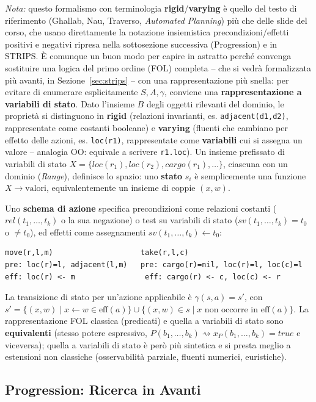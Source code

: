 \documentclass[a4paper,11pt]{article}
\begin{document}
\emph{Nota:} questo formalismo con terminologia \textbf{rigid}/\textbf{varying} è quello del testo di riferimento (Ghallab, Nau, Traverso, \emph{Automated Planning}) più che delle slide del corso, che usano direttamente la notazione insiemistica precondizioni/effetti positivi e negativi ripresa nella sottosezione successiva (Progression) e in STRIPS. È comunque un buon modo per capire in astratto perché convenga sostituire una logica del primo ordine (FOL) completa -- che si vedrà formalizzata più avanti, in Sezione~\ref{sec:strips} -- con una rappresentazione più snella: per evitare di enumerare esplicitamente $S,A,\gamma$, conviene una \textbf{rappresentazione a variabili di stato}. Dato l'insieme $B$ degli oggetti rilevanti del dominio, le proprietà si distinguono in \textbf{rigid} (relazioni invarianti, es. \texttt{adjacent(d1,d2)}, rappresentate come costanti booleane) e \textbf{varying} (fluenti che cambiano per effetto delle azioni, es. \texttt{loc(r1)}, rappresentate come \textbf{variabili} cui si assegna un valore -- analogia OO: equivale a scrivere \texttt{r1.loc}). Un insieme prefissato di variabili di stato $X=\{loc(r_1),loc(r_2),cargo(r_1),\ldots\}$, ciascuna con un dominio (\emph{Range}), definisce lo spazio: uno \textbf{stato} $s_i$ è semplicemente una funzione $X\to\text{valori}$, equivalentemente un insieme di coppie $(x,w)$.

Uno \textbf{schema di azione} specifica precondizioni come relazioni costanti ($rel(t_1,\ldots,t_k)$ o la sua negazione) o test su variabili di stato ($sv(t_1,\ldots,t_k)=t_0$ o $\neq t_0$), ed effetti come assegnamenti $sv(t_1,\ldots,t_k)\leftarrow t_0$:
\begin{lstlisting}
move(r,l,m)                    take(r,l,c)
pre: loc(r)=l, adjacent(l,m)   pre: cargo(r)=nil, loc(r)=l, loc(c)=l
eff: loc(r) <- m                eff: cargo(r) <- c, loc(c) <- r
\end{lstlisting}
La transizione di stato per un'azione applicabile è $\gamma(s,a)=s'$, con $s'=\{(x,w)\mid x{\leftarrow}w\in\text{eff}(a)\}\cup\{(x,w)\in s\mid x\text{ non occorre in eff}(a)\}$. La rappresentazione FOL classica (predicati) e quella a variabili di stato sono \textbf{equivalenti} (stesso potere espressivo, $P(b_1,\ldots,b_k)\rightsquigarrow x_P(b_1,\ldots,b_k){=}true$ e viceversa); quella a variabili di stato è però più sintetica e si presta meglio a estensioni non classiche (osservabilità parziale, fluenti numerici, euristiche).

\subsection{Progression: Ricerca in Avanti}
\end{document}
